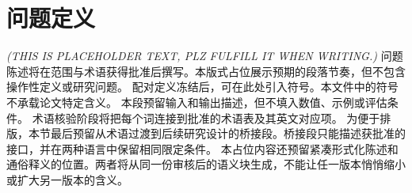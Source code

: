 \section{问题定义}\label{sec:problem-definition}
\textit{(THIS IS PLACEHOLDER TEXT, PLZ FULFILL IT WHEN WRITING.)}
问题陈述将在范围与术语获得批准后撰写。本版式占位展示预期的段落节奏，但不包含操作性定义或研究问题。
配对定义冻结后，可在此处引入符号。本文件中的符号不承载论文特定含义。
本段预留输入和输出描述，但不填入数值、示例或评估条件。
术语核验阶段将把每个词连接到批准的术语表及其英文对应项。
为便于排版，本节最后预留从术语过渡到后续研究设计的桥接段。桥接段只能描述获批准的接口，并在两种语言中保留相同限定条件。
本占位内容还预留紧凑形式化陈述和通俗释义的位置。两者将从同一份审核后的语义块生成，不能让任一版本悄悄缩小或扩大另一版本的含义。
